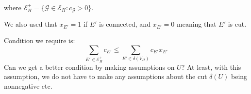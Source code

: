 where $\mathcal{E}^+_H= \{ \mathcal{G} \in \mathcal{E}_H: c_{\mathcal{G}} >0 \}$. 

We also used that $x_{E'}=1$ if $E'$ is connected, and $x_{E'}=0$ meaning that $E'$ is cut. 

Condition we require is: 
\[ \sum_{E' \in \mathcal{E}^+_H} c_{E'} \leq \sum_{E' \in \delta(V_H)} c_{E'} x_{E'} \]
Can we get a better condition by making assumptions on $U$? At least, with this assumption, we do not have to make any assumptions about the cut $\delta(U)$ being nonnegative etc.  

